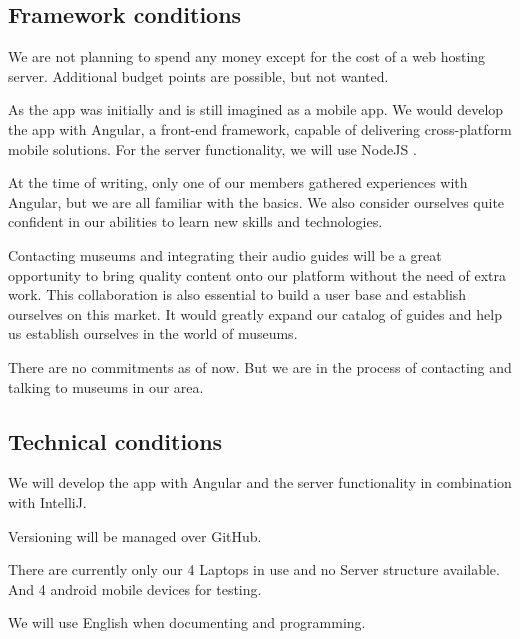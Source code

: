 \documentclass[12pt]{article}
\theoremstyle{definition}
\newenvironment{text}{
}{}
\begin{document}
\subsection{Framework conditions} 
\begin{text}

We are not planning to spend any money except for the cost of a web hosting server. Additional budget points are possible, but not wanted.\newline

As the app was initially and is still imagined as a mobile app. We would develop the app with Angular, a front-end framework, capable of delivering cross-platform mobile solutions. For the server functionality, we will use NodeJS .\newline
 
At the time of writing, only one of our members gathered experiences with Angular, but we are all familiar with the basics.
We also consider ourselves quite confident in our abilities to learn new skills and technologies.\newline
 
Contacting museums and integrating their audio guides will be a great opportunity to bring quality content onto our platform without the need of extra work. This collaboration is also essential to build a user base and establish ourselves on this market.
It would greatly expand our catalog of guides and help us establish ourselves in the world of museums.\newline
 
There are no commitments as of now. But we are in the process of contacting and talking to museums in our area.

\end{text}

\subsection{Technical conditions}
\begin{text}

We will develop the app with Angular and the server functionality in combination with IntelliJ.

Versioning will be managed over GitHub.\newline
 
There are currently only our 4 Laptops in use and no Server structure available. And 4 android mobile devices for testing.
 
We will use English when documenting and programming.

\end{text}
  
\end{document}

